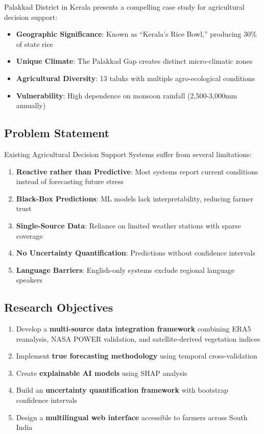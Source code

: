 \documentclass[conference,11pt]{IEEEtran}
\begin{document}
Palakkad District in Kerala presents a compelling case study for agricultural decision support:
\begin{itemize}
    \item \textbf{Geographic Significance}: Known as ``Kerala's Rice Bowl,'' producing 30\% of state rice
    \item \textbf{Unique Climate}: The Palakkad Gap creates distinct micro-climatic zones
    \item \textbf{Agricultural Diversity}: 13 taluks with multiple agro-ecological conditions
    \item \textbf{Vulnerability}: High dependence on monsoon rainfall (2,500-3,000mm annually)
\end{itemize}

\subsection{Problem Statement}

Existing Agricultural Decision Support Systems suffer from several limitations:
\begin{enumerate}
    \item \textbf{Reactive rather than Predictive}: Most systems report current conditions instead of forecasting future stress
    \item \textbf{Black-Box Predictions}: ML models lack interpretability, reducing farmer trust
    \item \textbf{Single-Source Data}: Reliance on limited weather stations with sparse coverage
    \item \textbf{No Uncertainty Quantification}: Predictions without confidence intervals
    \item \textbf{Language Barriers}: English-only systems exclude regional language speakers
\end{enumerate}

\subsection{Research Objectives}

\begin{enumerate}
    \item Develop a \textbf{multi-source data integration framework} combining ERA5 reanalysis, NASA POWER validation, and satellite-derived vegetation indices
    \item Implement \textbf{true forecasting methodology} using temporal cross-validation
    \item Create \textbf{explainable AI models} using SHAP analysis
    \item Build an \textbf{uncertainty quantification framework} with bootstrap confidence intervals
    \item Design a \textbf{multilingual web interface} accessible to farmers across South India
\end{enumerate}
\end{document}
